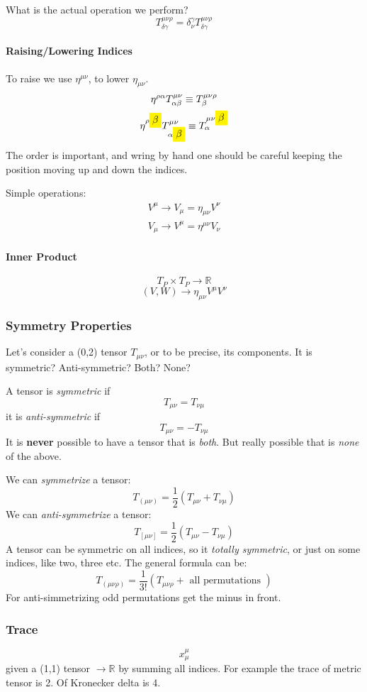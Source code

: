 What is the actual operation we perform?
\[
T^{\mu \nu \rho }_{\delta  \gamma } = \delta^{\gamma }_{\nu } T^{\mu  \nu \rho }_{\delta \gamma }
\]
\paragraph{Raising/Lowering Indices}
To raise we use $\eta^{\mu \nu }$, to lower $\eta_{\mu \nu }$.
\begin{gather*}
\eta^{\rho \alpha } T^{\mu \nu }_{\alpha \beta } \equiv T^{\mu  \nu  \rho }_{ \beta  } \\
\eta^{\rho \colorbox{yellow}{$ \beta   $} } T^{\mu \nu }_{\alpha \colorbox{yellow}{$ \beta   $} } \equiv T^{\mu \nu \colorbox{yellow}{$ \beta   $} }_{\alpha }
\end{gather*}
The order is important, and wring by hand one should be careful keeping the position moving up and down the indices. \par

Simple operations:
\begin{gather*}
V^{\mu } \to V_{\mu} = \eta_{\mu \nu } V^{\nu } \\
V_{\mu } \to V^{\mu } = \eta^{\mu \nu } V_{\nu }
\end{gather*}

\paragraph{Inner Product}
\[
	T_{P}\times T_{P} \to \mathbb{R}
\]
\[
	\left( V,W \right) \to \eta_{\mu \nu }V^{\mu }V^{\nu }
\]

\subsubsection{Symmetry Properties}
Let's consider a (0,2) tensor $T_{\mu \nu }$, or to be precise, its components.
It is symmetric? Anti-symmetric? Both? None?

A tensor is \emph{symmetric} if
\[
T_{\mu \nu } = T_{\nu  \mu }
\]
it is \emph{anti-symmetric} if
\[
T_{\mu  \nu } = - T_{\nu  \mu }
\]
It is \textbf{never} possible to have a tensor that is \emph{both}. But really possible that is \emph{none} of the above.

We can \emph{symmetrize} a tensor:
\[
T_{\left( \mu  \nu  \right)} = \frac{1}{2} \left( T_{\mu  \nu } + T_{\nu \mu } \right)
\]
We can \emph{anti-symmetrize} a tensor:
\[
	T_{[\mu  \nu ]} = \frac{1}{2} \left( T_{\mu \nu } - T_{\nu  \mu } \right)
\]
A tensor can be symmetric on all indices, so it \emph{totally symmetric}, or just on some indices, like two, three etc.
The general formula can be:
\[
T_{\left( \mu  \nu  \rho  \right)} = \frac{1}{3!} \left( T_{\mu  \nu  \rho } + \text{ all permutations } \right)
\]
For anti-simmetrizing odd permutations get the minus in front.

\subsubsection{Trace}
\[
x^{\mu }_{\mu }
\]
given a (1,1) tensor $\to \mathbb{R}$ by summing all indices.
For example the trace of metric tensor is 2.
Of Kronecker delta is 4.

